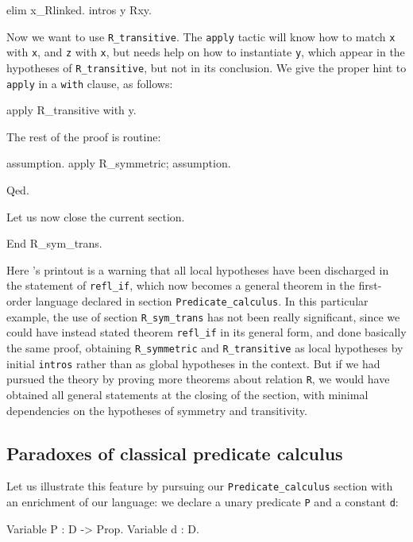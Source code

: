 \documentclass[11pt,a4paper]{book}
\begin{document}
\begin{coq_example}
elim x_Rlinked.
intros y Rxy.
\end{coq_example}

Now we want to use \verb:R_transitive:. The \verb:apply: tactic will know
how to match \verb:x: with \verb:x:, and \verb:z: with \verb:x:, but needs
help on how to instantiate \verb:y:, which appear in the hypotheses of
\verb:R_transitive:, but not in its conclusion. We give the proper hint
to \verb:apply: in a \verb:with: clause, as follows:
\begin{coq_example}
apply R_transitive with y.
\end{coq_example}

The rest of the proof is routine:
\begin{coq_example}
assumption.
apply R_symmetric; assumption.
\end{coq_example}
\begin{coq_example*}
Qed.
\end{coq_example*}

Let us now close the current section.
\begin{coq_example}
End R_sym_trans.
\end{coq_example}

Here \Coq's printout is a warning that all local hypotheses have been 
discharged in the statement of \verb:refl_if:, which now becomes a general
theorem in the first-order language declared in section 
\verb:Predicate_calculus:. In this particular example, the use of section
\verb:R_sym_trans: has not been really significant, since we could have
instead stated theorem \verb:refl_if: in its general form, and done 
basically the same proof, obtaining \verb:R_symmetric: and
\verb:R_transitive: as local hypotheses by initial \verb:intros: rather
than as global hypotheses in the context. But if we had pursued the
theory by proving more theorems about relation \verb:R:,
we would have obtained all general statements at the closing of the section,
with minimal dependencies on the hypotheses of symmetry and transitivity.

\subsection{Paradoxes of classical predicate calculus}

Let us illustrate this feature by pursuing our \verb:Predicate_calculus:
section with an enrichment of our language: we declare a unary predicate
\verb:P: and a constant \verb:d::
\begin{coq_example}
Variable P :  D -> Prop.
Variable d : D.
\end{coq_example}
\end{document}
